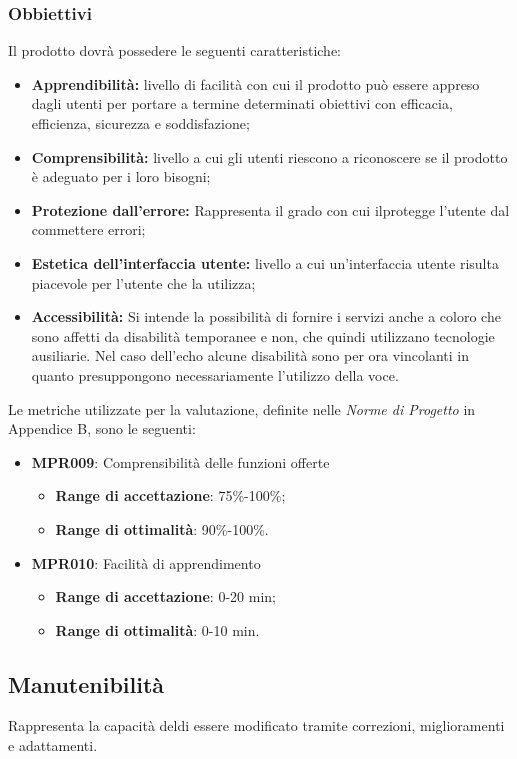 \subsubsection{Obbiettivi } Il prodotto dovrà possedere le seguenti caratteristiche:
\begin{itemize}
	\item \textbf{Apprendibilità:} livello di facilità con cui il prodotto può essere appreso dagli utenti per portare a termine determinati obiettivi con efficacia, efficienza, sicurezza e soddisfazione;
	\item \textbf{Comprensibilità:} livello a cui gli utenti riescono a riconoscere se il prodotto è adeguato per i loro bisogni;
	\item \textbf{Protezione dall'errore:} Rappresenta il grado con cui ilprotegge l'utente dal commettere errori;
	\item \textbf{Estetica dell'interfaccia utente:} livello a cui un'interfaccia utente risulta piacevole per l'utente che la utilizza;
	\item \textbf{Accessibilità:} Si intende la possibilità di fornire i servizi anche a coloro che sono affetti da disabilità temporanee e non, che quindi utilizzano tecnologie ausiliarie.
	Nel caso dell'echo alcune disabilità sono per ora vincolanti in quanto presuppongono necessariamente l'utilizzo della voce.
\end{itemize}
Le metriche utilizzate per la valutazione, definite nelle \textit{Norme di Progetto} in Appendice B, sono le seguenti:
\begin{itemize}
	\item \textbf{MPR009}: Comprensibilità delle funzioni offerte
	\begin{itemize}
		\item \textbf{Range di accettazione}: 75\%-100\%;
		\item \textbf{Range di ottimalità}: 90\%-100\%.
	\end{itemize}
	\item \textbf{MPR010}: Facilità di apprendimento
	\begin{itemize}
		\item \textbf{Range di accettazione}: 0-20 min;
		\item \textbf{Range di ottimalità}: 0-10 min.
	\end{itemize}
\end{itemize}

\subsection{Manutenibilità}
Rappresenta la capacità deldi essere modificato tramite correzioni, miglioramenti e adattamenti.
